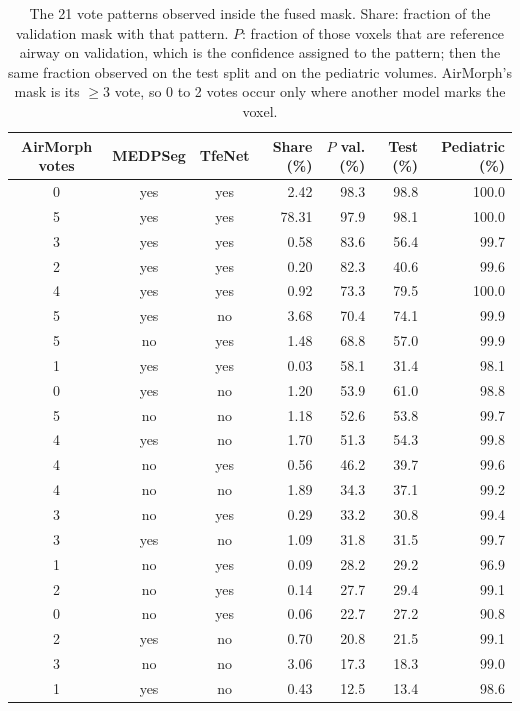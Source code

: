 \documentclass[runningheads]{llncs}
\begin{document}
\begin{table}[tbp]
\centering
\caption{The 21 vote patterns observed inside the fused mask. Share: fraction
of the validation mask with that pattern. $P$: fraction of those voxels that
are reference airway on validation, which is the confidence assigned to the
pattern; then the same fraction observed on the test split and on the
pediatric volumes. AirMorph's mask is its $\geq 3$ vote, so 0 to 2 votes
occur only where another model marks the voxel.}
\label{tab:patterns}
\setlength{\tabcolsep}{3pt}\footnotesize
\begin{tabular}{@{}cccrrrr@{}}
\toprule
AirMorph votes & MEDPSeg & TfeNet & Share (\%) & $P$ val. (\%) & Test (\%) & Pediatric (\%) \\
\midrule
0 & yes & yes & 2.42 & 98.3 & 98.8 & 100.0 \\
5 & yes & yes & 78.31 & 97.9 & 98.1 & 100.0 \\
3 & yes & yes & 0.58 & 83.6 & 56.4 & 99.7 \\
2 & yes & yes & 0.20 & 82.3 & 40.6 & 99.6 \\
4 & yes & yes & 0.92 & 73.3 & 79.5 & 100.0 \\
5 & yes & no & 3.68 & 70.4 & 74.1 & 99.9 \\
5 & no & yes & 1.48 & 68.8 & 57.0 & 99.9 \\
1 & yes & yes & 0.03 & 58.1 & 31.4 & 98.1 \\
0 & yes & no & 1.20 & 53.9 & 61.0 & 98.8 \\
5 & no & no & 1.18 & 52.6 & 53.8 & 99.7 \\
4 & yes & no & 1.70 & 51.3 & 54.3 & 99.8 \\
4 & no & yes & 0.56 & 46.2 & 39.7 & 99.6 \\
4 & no & no & 1.89 & 34.3 & 37.1 & 99.2 \\
3 & no & yes & 0.29 & 33.2 & 30.8 & 99.4 \\
3 & yes & no & 1.09 & 31.8 & 31.5 & 99.7 \\
1 & no & yes & 0.09 & 28.2 & 29.2 & 96.9 \\
2 & no & yes & 0.14 & 27.7 & 29.4 & 99.1 \\
0 & no & yes & 0.06 & 22.7 & 27.2 & 90.8 \\
2 & yes & no & 0.70 & 20.8 & 21.5 & 99.1 \\
3 & no & no & 3.06 & 17.3 & 18.3 & 99.0 \\
1 & yes & no & 0.43 & 12.5 & 13.4 & 98.6 \\
\bottomrule
\end{tabular}
\end{table}
\end{document}
